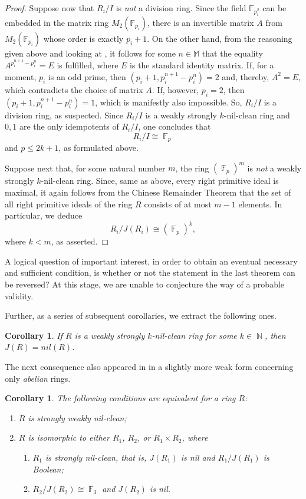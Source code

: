 \documentclass{amsart}
\DeclareMathOperator{\N}{\mathbb{N}}
\DeclareMathOperator{\F}{\mathbb{F}}
\newtheorem{corollary}[theorem]{Corollary}
\theoremstyle{definition}
\theoremstyle{remark}
\numberwithin{equation}{section}
\begin{document}
\begin{proof}
Suppose now that $R_i/I$ is {\it not} a division ring. Since the field $\mathbb{F}_{p^2_i}$ can be embedded in the matrix ring $M_2(\mathbb{F}_{p_i})$, there is an invertible matrix $A$ from $M_2(\mathbb{F}_{p_i})$ whose order is exactly $p_i+1$. On the other hand, from the reasoning given above and looking at \cite[11.19]{Lam01}, it follows for some $n\in \mathbb{M}$ that the equality $A^{p_i^{n+1}-p_i^n}=E$ is fulfilled, where $E$ is the standard identity matrix. If, for a moment, $p_i$ is an odd prime, then $(p_i+1, p_i^{n+1}-p_i^n)=2$ and, thereby, $A^2=E$, which contradicts the choice of matrix $A$. If, however, $p_i=2$, then $(p_i+1, p_i^{n+1}-p_i^n)=1$, which is manifestly also impossible. So, $R_i/I$ is a division ring, as suspected. Since $R_i/I$ is a weakly strongly $k$-nil-clean ring and $0,1$ are the only idempotents of $R_i/I$, one concludes that $$R_i/I\cong \F_p$$ and $p\leq 2k+1$, as formulated above.

Suppose next that, for some natural number $m$, the ring $(\F_p)^m$ is {\it not} a weakly strongly $k$-nil-clean ring. Since, same as above, every right primitive ideal is maximal, it again follows from the Chinese Remainder Theorem that the set of all right primitive ideals of the ring $R$ consists of at most $m-1$ elements. In particular, we deduce $$R_i/J(R_i)\cong (\F_p)^k,$$ where $k<m$, as asserted.
\end{proof}

A logical question of important interest, in order to obtain an eventual necessary and sufficient condition, is whether or not the statement in the last theorem can be reversed? At this stage, we are unable to conjecture the way of a probable validity.

\medskip

Further, as a series of subsequent corollaries, we extract the following ones.

\begin{corollary} If $R$ is a weakly strongly $k$-nil-clean ring for some $k\in \N$, then $J(R)=nil(R)$.
\end{corollary}

The next consequence also appeared in \cite{BDZ} in a slightly more weak form concerning only {\it abelian} rings.

\begin{corollary}\label{ca2} \cite[Theorem 1]{KZ16}
The following conditions are equivalent for a ring $R$:
\begin{enumerate}

\item[(1)] $R$ is strongly weakly nil-clean;
\item[(2)] $R$ is isomorphic to either $R_1$, $R_2$, or $R_1\times R_2$, where
\begin{enumerate}
\item[(a)] $R_1$ is strongly nil-clean, that is, $J(R_1)$ is nil and $R_1/J(R_1)$ is Boolean;
\item[(b)] $R_2/J(R_2)\cong \F_3$ and $J(R_2)$ is nil.
\end{enumerate}

\end{enumerate}
\end{corollary}
\end{document}
